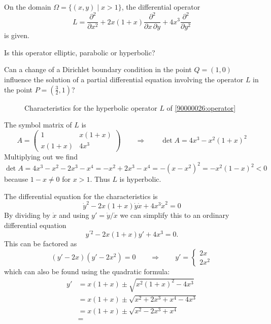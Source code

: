 On the domain $\Omega= \{(x,y)\mid x > 1\}$, the differential operator
\begin{equation}
L
=
\frac{\partial^2}{\partial x^2}
+
2x(1+x)\frac{\partial^2}{\partial x\,\partial y}
+
4x^3
\frac{\partial^2}{\partial y^2}
\label{90000026:operator}
\end{equation}
is given.
\begin{teilaufgaben}
\item
Is this operator elliptic, parabolic or hyperbolic?
\item
Can a change of a Dirichlet boundary condition in the point $Q=(1,0)$
influence the solution of a partial differential equation involving the
operator $L$ in the point $P=(\frac32,1)$?
\end{teilaufgaben}

\begin{loesung}
\begin{figure}
\centering
{}
\caption{Characteristics for the hyperbolic operator $L$ of
\eqref{90000026:operator}
\label{90000026:fig}}
\end{figure}
\begin{teilaufgaben}
\item
The symbol matrix of $L$ is
\[
A
=
\begin{pmatrix}
  1    & x(1+x) \\
x(1+x) & 4x^3
\end{pmatrix}
\qquad\Rightarrow\qquad
\det A = 4x^3 -x^2(1+x)^2
\]
Multiplying out we find
\[
\det A
=
4x^3 - x^2 -2x^3 -x^4
=
-x^2 + 2x^3 -x^4
=
-(x-x^2)^2
=
-x^2 (1-x)^2
<
0
\]
because $1-x\ne 0$ for $x>1$.
Thus  $L$ is hyperbolic.
\item
The differential equation for the characteristics is
\[
\dot{y}^2 -2x(1+x) \dot{y}\dot{x} + 4x^3\dot{x}^2 = 0
\]
By dividing by $\dot{x}$ and using $y'=\dot{y}/\dot{x}$ we can simplify
this to an ordinary differential equation
\[
y^{\prime 2} -2x(1+x)y' + 4x^3 = 0.
\]
This can be factored as
\[
(y'-2x)(y'-2x^2) = 0
\qquad\Rightarrow\qquad
y'
=
\begin{cases}
2x\\
2x^2
\end{cases}
\]
which can also be found using the quadratic formula:
\begin{align*}
y'
&=
x(1+x) \pm \sqrt{x^2(1+x)^2 - 4x^3}
\\
&=
x(1+x) \pm \sqrt{x^2+2x^3+x^4-4x^3}
\\
&=
x(1+x) \pm \sqrt{x^2-2x^3+x^4}
\\
&=

\end{align*}
\end{teilaufgaben}
\end{loesung}
